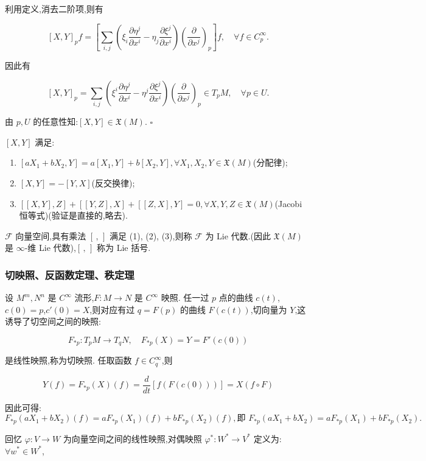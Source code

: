 利用定义,消去二阶项,则有

\[
[X, Y]_p f = \left[ \sum_{i,j} \left( \xi_i \frac{\partial \eta^j}{\partial x^i} - \eta_j \frac{\partial \xi^j}{\partial x^i} \right) \left( \frac{\partial}{\partial x^j} \right)_p \right] f, \quad \forall f \in C_p^\infty.
\]

因此有

\[
[X,Y]_p = \sum_{i,j} \left( \xi^i \frac{\partial \eta^j}{\partial x^i} - \eta^j \frac{\partial \xi^j}{\partial x^i} \right) \left( \frac{\partial }{\partial x^j} \right)_p \in T_pM, \quad \forall p \in U.
\]

由 $p, U$ 的任意性知:$[X,Y] \in \mathfrak{X}(M)$. $\square$

$[X,Y]$ 满足:
\begin{enumerate}
    \item $[aX_1 + bX_2, Y] = a[X_1, Y] + b[X_2, Y], \forall X_1, X_2, Y \in \mathfrak{X}(M)$(分配律);
    \item $[X,Y] = -[Y,X]$(反交换律);
    \item $[[X,Y], Z] + [[Y,Z], X] + [[Z,X], Y] = 0, \forall X, Y, Z \in \mathfrak{X}(M)$(Jacobi 恒等式)(验证是直接的,略去).
\end{enumerate}

\begin{definition}
$\mathcal{F}$ 向量空间,具有乘法 $[\, , \,]$ 满足 (1), (2), (3),则称 $\mathcal{F}$ 为 Lie 代数.(因此 $\mathfrak{X}(M)$ 是 $\infty$-维 Lie 代数),$[\, , \,]$ 称为 Lie 括号.
\end{definition}

\subsubsection{切映照、反函数定理、秩定理}

设 $M^m, N^n$ 是 $C^\infty$ 流形,$F : M \to N$ 是 $C^\infty$ 映照.
任一过 $p$ 点的曲线 $c(t)$,$c(0) = p$,$c'(0) = X$,则对应有过 $q = F(p)$ 的曲线 $F(c(t))$,切向量为 $Y$,这诱导了切空间之间的映照:

\[
F_{*p} : T_pM \to T_qN, \quad F_{*p}(X) = Y = F'(c(0))
\]

是线性映照,称为切映照.
任取函数 $f \in C_q^\infty$,则

\[
Y(f) = F_{*p}(X)(f) = \frac{d}{dt}[f(F(c(0)))] = X(f \circ F)
\]

因此可得:
\[
F_{*p}(aX_1 + bX_2)(f) = aF_{*p}(X_1)(f) + bF_{*p}(X_2)(f), \text{即 } F_{*p}(aX_1 + bX_2) = aF_{*p}(X_1) + bF_{*p}(X_2).
\]

回忆 $\varphi : V \to W$ 为向量空间之间的线性映照,对偶映照 $\varphi^* : W^* \to V^*$ 定义为:$\forall w^* \in W^*$,

